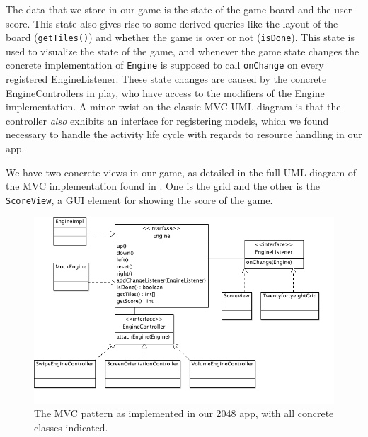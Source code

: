 \documentclass[a4paper, 12pt]{article}
\newcommand{\code}[1]{\texttt{#1}}
\begin{document}
The data that we store in our game is the state of the game board and
the user score. This state also gives rise to some derived queries
like the layout of the board (\code{getTiles()}) and whether the game
is over or not (\code{isDone}). This state is used to visualize the
state of the game, and whenever the game state changes the concrete
implementation of \code{Engine} is supposed to call \code{onChange} on
every registered EngineListener. These state changes are caused by the
concrete EngineControllers in play, who have access to the modifiers
of the Engine implementation. A minor twist on the classic MVC UML
diagram is that the controller \emph{also} exhibits an interface for
registering models, which we found necessary to handle the activity
life cycle with regards to resource handling in our app.

We have two concrete views in our game, as detailed in the full UML
diagram of the MVC implementation found in \label{fig:mvc-2.png}. One
is the grid and the other is the \code{ScoreView}, a GUI element for
showing the score of the game.

\begin{figure}[!h]
  \includegraphics[width=\linewidth]{mvc-2.png}
  \caption{The MVC pattern as implemented in our 2048 app, with all
    concrete classes indicated.}
  \label{fig:mvc-2.png}
\end{figure}
\end{document}
